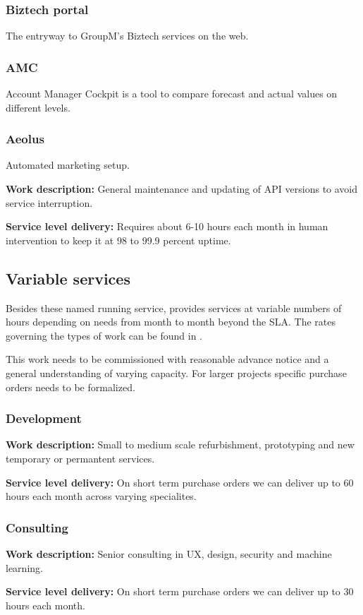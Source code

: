 \subsubsection{Biztech portal}
The entryway to GroupM's Biztech services on the web.

\subsubsection{AMC}
Account Manager Cockpit is a tool to compare forecast and actual values on different levels.

\subsubsection{Aeolus}
Automated marketing setup.

\textbf{Work description:} General maintenance and updating of API versions to avoid service interruption.

\textbf{Service level delivery:} Requires about 6-10 hours each month in human intervention to keep it at 98 to 99.9 percent uptime.

\subsection{Variable services}
Besides these named running service, \suppliername provides services at variable numbers of hours depending on \customername needs from month to month beyond the SLA. The rates governing the types of work can be found in .

This work needs to be commissioned with reasonable advance notice and a general understanding of varying capacity. For larger projects specific purchase orders needs to be formalized.

\subsubsection{Development}
\textbf{Work description:} Small to medium scale refurbishment, prototyping and new temporary or permantent services.

\textbf{Service level delivery:} On short term purchase orders we can deliver up to 60 hours each month across varying specialites.

\subsubsection{Consulting}
\textbf{Work description:} Senior consulting in UX, design, security and machine learning.

\textbf{Service level delivery:} On short term purchase orders we can deliver up to 30 hours each month.


